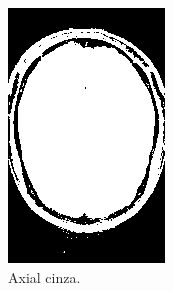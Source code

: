 \documentclass{article}
\begin{document}
\begin{figure}[h]
\begin{subfigure}[b]{0.3\textwidth}
        \includegraphics[width=\textwidth]{brain/neuroradiologist-axial-gray.png}
        \caption{Axial cinza.}
    \end{subfigure}
    ~
    \begin{subfigure}[b]{0.3\textwidth}

\end{subfigure}
\end{figure}
\end{document}
